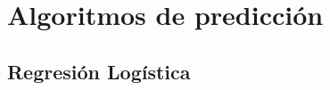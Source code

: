 
\section{Algoritmos de predicción} %
\label{sec:algoritmos_de_prediccion}

\subsection{Regresión Logística} %
\label{sub:regresion_logistica}

